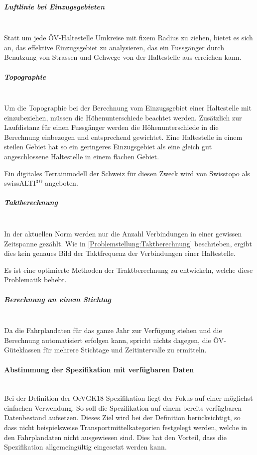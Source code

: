 \subparagraph{Luftlinie bei Einzugsgebieten}~\\
\label{Evaluierung grundlegender Verbesserungen:Luftlinie bei Einzugsgebieten}
Statt um jede \acs{ÖV}-Haltestelle Umkreise mit fixem Radius zu ziehen, bietet es sich an, das effektive Einzugsgebiet zu analysieren, das ein Fussgänger durch Benutzung von Strassen und Gehwege von der Haltestelle aus erreichen kann.

\subparagraph{Topographie}~\\
\label{Evaluierung grundlegender Verbesserungen:Topographie}
Um die Topographie bei der Berechnung vom Einzugsgebiet einer Haltestelle mit einzubeziehen, müssen die Höhenunterschiede beachtet werden.
Zusätzlich zur Laufdistanz für einen Fussgänger werden die Höhenunterschiede in die Berechnung einbezogen und entsprechend gewichtet.
Eine Haltestelle in einem steilen Gebiet hat so ein geringeres Einzugsgebiet als eine gleich gut angeschlossene Haltestelle in einem flachen Gebiet.

Ein digitales \gls{Terrainmodell} der Schweiz für diesen Zweck wird von Swisstopo als swissALTI$^{3D}$ angeboten.~\cite{swissalti3d_swisstopo}

\subparagraph{Taktberechnung}~\\
\label{Evaluierung grundlegender Verbesserungen:Taktberechnung}
In der aktuellen Norm werden nur die Anzahl Verbindungen in einer gewissen Zeitspanne gezählt.
Wie in \ref{Problemstellung:Taktberechnung} beschrieben, ergibt dies kein genaues Bild der Taktfrequenz der Verbindungen einer Haltestelle.

Es ist eine optimierte Methoden der Traktberechnung zu entwickeln, welche diese Problematik behebt.

\subparagraph{Berechnung an einem Stichtag}~\\
\label{Evaluierung grundlegender Verbesserungen:Berechnung an einem Stichtag}
Da die Fahrplandaten für das ganze Jahr zur Verfügung stehen und die Berechnung automatisiert erfolgen kann, spricht nichts dagegen, die \acs{ÖV}-Güteklassen für mehrere Stichtage und Zeitintervalle zu ermitteln.

\paragraph{Abstimmung der Spezifikation mit verfügbaren Daten}~\\
\label{Spezifikation OeVGK18:Abstimmung Spezifikation mit verfügbaren Daten}
Bei der Definition der \gls{OeVGK18}-Spezifikation liegt der Fokus auf einer möglichst einfachen Verwendung.
So soll die Spezifikation auf einem bereits verfügbaren Datenbestand aufsetzen.
Dieses Ziel wird bei der Definition berücksichtigt, so dass nicht beispielsweise Transportmittelkategorien festgelegt werden, welche in den Fahrplandaten nicht ausgewiesen sind.
Dies hat den Vorteil, dass die Spezifikation allgemeingültig eingesetzt werden kann.

